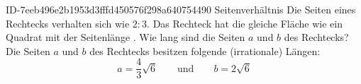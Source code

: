 \begin{exercise}
      {ID-7eeb496e2b1953d3fffd450576f298a640754490}
      {Seitenverhältnis}
  \ifproblem\problem
    Die Seiten eines Rechtecks verhalten sich wie $2:3$. Das Rechteck hat
    die gleiche Fläche wie ein Quadrat mit der Seitenlänge .
    Wie lang sind die Seiten $a$ und $b$ des Rechtecks?
  \fi
  \ifoutcome\outcome
    Die Seiten $a$ und $b$ des Rechtecks besitzen folgende (irrationale) Längen:
    \begin{equation*}
      a=\frac{4}{3}\sqrt{6}
      \qquad\text{und}\qquad
      b=2\sqrt{6}
    \end{equation*}
  \fi
\end{exercise}

